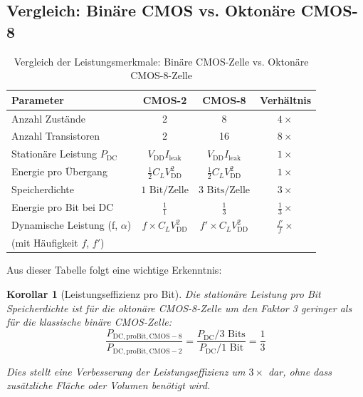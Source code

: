 \documentclass[12pt, a4paper]{article}
\newtheorem{corollary}[theorem]{Korollar}
\theoremstyle{definition}
\theoremstyle{remark}
\begin{document}
\subsection{Vergleich: Binäre CMOS vs. Oktonäre CMOS-8}
\label{subsec:vergleich_binair_oktonaer}

\begin{table}[H]
\centering
\small
\caption{Vergleich der Leistungsmerkmale: Binäre CMOS-Zelle vs. Oktonäre CMOS-8-Zelle}
\label{tab:cmos_vergleich}
\begin{tabular}{l|c|c|c}
\toprule
\textbf{Parameter} & \textbf{CMOS-2} & \textbf{CMOS-8} & \textbf{Verhältnis} \\
\midrule
Anzahl Zustände & 2 & 8 & $4\times$ \\
Anzahl Transistoren & 2 & 16 & $8\times$ \\
Stationäre Leistung $P_{\mathrm{DC}}$ & $V_{\mathrm{DD}} I_{\mathrm{leak}}$ & $V_{\mathrm{DD}} I_{\mathrm{leak}}$ & $1\times$ \\
Energie pro Übergang & $\frac{1}{2}C_L V_{\mathrm{DD}}^2$ & $\frac{1}{2}C_L V_{\mathrm{DD}}^2$ & $1\times$ \\
Speicherdichte & $1 \text{ Bit/Zelle}$ & $3 \text{ Bits/Zelle}$ & $3\times$ \\
Energie pro Bit bei DC & $\frac{1}{1}$ & $\frac{1}{3}$ & $\frac{1}{3}\times$ \\
\midrule
Dynamische Leistung (f, $\alpha$) & $f \times C_L V_{\mathrm{DD}}^2$ & $f' \times C_L V_{\mathrm{DD}}^2$ & $\frac{f'}{f}\times$ \\
(mit Häufigkeit $f$, $f'$) & & &  \\
\bottomrule
\end{tabular}
\end{table}

Aus dieser Tabelle folgt eine wichtige Erkenntnis:

\begin{corollary}[Leistungseffizienz pro Bit]
\label{cor:leistungseffizienz_pro_bit}
Die stationäre Leistung pro Bit Speicherdichte ist für die oktonäre CMOS-8-Zelle um den Faktor 3 geringer als für die klassische binäre CMOS-Zelle:
\[
\frac{P_{\mathrm{DC, pro Bit, CMOS-8}}}{P_{\mathrm{DC, pro Bit, CMOS-2}}} = \frac{P_{\mathrm{DC}} / 3 \text{ Bits}}{P_{\mathrm{DC}} / 1 \text{ Bit}} = \frac{1}{3}
\]

Dies stellt eine Verbesserung der Leistungseffizienz um $3\times$ dar, ohne dass zusätzliche Fläche oder Volumen benötigt wird.
\end{corollary}
\end{document}
